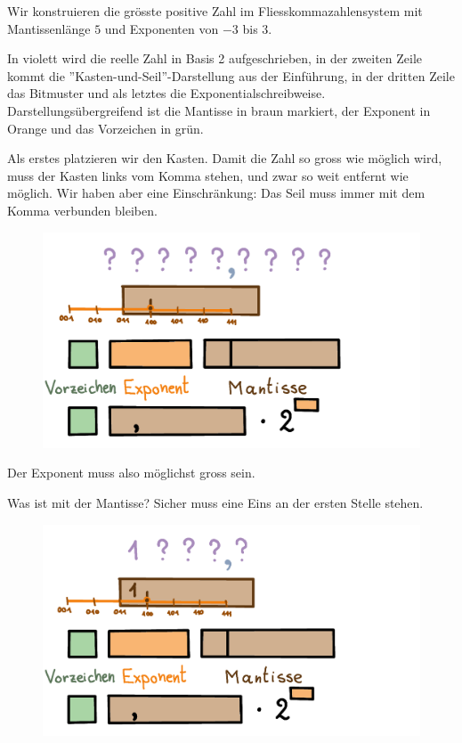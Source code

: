 \begin{beispiel}
Wir konstruieren die grösste positive Zahl im Fliesskommazahlensystem mit Mantissenlänge \(5\) und Exponenten von \(-3\) bis \(3\).

In violett wird die reelle Zahl in Basis 2 aufgeschrieben, in der zweiten Zeile kommt die ''Kasten-und-Seil''-Darstellung aus der Einführung, in der dritten Zeile das Bitmuster und als letztes die Exponentialschreibweise. Darstellungsübergreifend ist die Mantisse in braun markiert, der Exponent in Orange und das Vorzeichen in grün.

Als erstes platzieren wir den Kasten. Damit die Zahl so gross wie möglich wird, muss der Kasten links vom Komma stehen, und zwar so weit entfernt wie möglich. Wir haben aber eine Einschränkung: Das Seil muss immer mit dem Komma verbunden bleiben.
\begin{figure}[H]
\centering
\includegraphics[width=0.85\linewidth]{Pictures/groessteZahl1.png}
\end{figure}
Der Exponent muss also möglichst gross sein.

Was ist mit der Mantisse? Sicher muss eine Eins an der ersten Stelle stehen.
\begin{figure}[H]
\centering
\includegraphics[width=0.85\linewidth]{Pictures/groessteZahl2.png}
\end{figure}


\end{beispiel}
